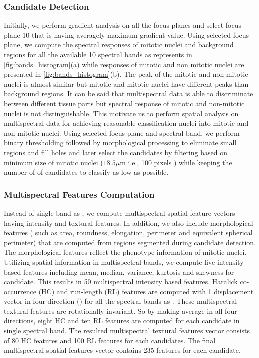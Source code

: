 \documentclass[10pt,twocolumn,letterpaper]{article}
\begin{document}
\subsubsection{Candidate Detection}
Initially, we perform gradient analysis on all the focus planes and select focus plane 10 that is having averagely maximum gradient value. Using selected focus plane, we compute the spectral responses of mitotic nuclei and background regions for all the available 10 spectral bands as represents in \ref{fig:bands_histogram}(a) while responses of mitotic and non mitotic nuclei are presented in \ref{fig:bands_histogram}(b). The peak of the mitotic and non-mitotic nuclei is almost similar but mitotic and mitotic nuclei have different peaks than background regions. It can be said that multispectral data is able to discriminate between different tissue parts but spectral response of mitotic and non-mitotic nuclei is not distinguishable. This motivate us to perform spatial analysis on multispectral data for achieving reasonable classification nuclei into mitotic and non-mitotic nuclei. Using selected focus plane and spectral band, we perform binary thresholding followed by morphological processing to eliminate small regions and fill holes and later select the candidates by filtering based on minimum size of mitotic nuclei ($18.5\mu\text{m}$ i.e., 100 pixels ) while keeping the number of of candidates to classify as low as possible. 

\subsubsection{Multispectral Features Computation}
Instead of single band as \cite{boucheron2007, masood2009, wu2009, wu2012}, we compute multispectral spatial feature vectors having intensity and textural features. In addition, we also include morphological features ( such as area, roundness, elongation, perimeter and equivalent spherical perimeter) that are computed from regions segmented during candidate detection. The morphological features reflect the phenotype information of mitotic nuclei. Utilizing spatial information in multispectral bands, we compute five intensity based features including mean, median, variance, kurtosis and skewness for candidate. This results in 50 multispectral intensity based features. Haralick co-occurrence (HC) \cite{haralick1973} and run-length (RL) \cite{galloway1975} features are computed with 1 displacement vector in four direction () for all the spectral bands as \cite{irshad2013b}. These multispectral textural features are rotationally invariant. So by making average in all four directions, eight HC and ten RL features are computed for each candidate in single spectral band. The resulted multispectral textural features vector consists of 80 HC features and 100 RL features for each candidates. The final multispectral spatial features vector contains 235 features for each candidate. 
\end{document}
